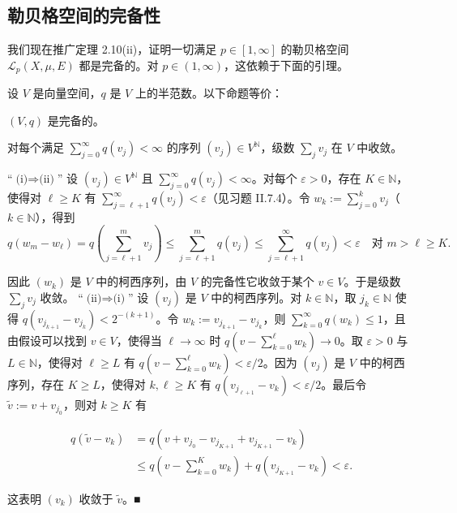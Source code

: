 \subsection*{勒贝格空间的完备性}

我们现在推广定理 2.10(ii)，证明一切满足 $ p \in [1,\infty] $ 的勒贝格空间 $ \mathcal{L}_p(X,\mu,E) $ 都是完备的。对 $ p \in (1,\infty) $，这依赖于下面的引理。

\begin{lemma}

设 $ V $ 是向量空间，$ q $ 是 $ V $ 上的半范数。以下命题等价：

\begin{subitems}
\item

$ (V,q) $ 是完备的。

\item

对每个满足 $ \sum_{j=0}^{\infty} q(v_j) < \infty $ 的序列 $ (v_j) \in V^{\mathbb{N}} $，级数 $ \sum_j v_j $ 在 $ V $ 中收敛。

\proofhead
“$ \text{(i)} \Rightarrow \text{(ii)} $” 设 $ (v_j) \in V^{\mathbb{N}} $ 且 $ \sum_{j=0}^{\infty} q(v_j) < \infty $。对每个 $ \varepsilon > 0 $，存在 $ K \in \mathbb{N} $，使得对 $ \ell \ge K $ 有 $ \sum_{j=\ell+1}^{\infty} q(v_j) < \varepsilon $（见习题 II.7.4）。令 $ w_k := \sum_{j=0}^{k} v_j $（$ k \in \mathbb{N} $），得到
\[
q(w_m - w_\ell) = q\left(\sum_{j=\ell+1}^{m} v_j\right) \le \sum_{j=\ell+1}^{m} q(v_j) \le \sum_{j=\ell+1}^{\infty} q(v_j) < \varepsilon \quad \text{对 } m > \ell \ge K .
\]

因此 $ (w_k) $ 是 $ V $ 中的柯西序列，由 $ V $ 的完备性它收敛于某个 $ v \in V $。于是级数 $ \sum_j v_j $ 收敛。
“$ \text{(ii)} \Rightarrow \text{(i)} $” 设 $ (v_j) $ 是 $ V $ 中的柯西序列。对 $ k \in \mathbb{N} $，取 $ j_k \in \mathbb{N} $ 使得 $ q(v_{j_{k+1}} - v_{j_k}) < 2^{-(k+1)} $。令 $ w_k := v_{j_{k+1}} - v_{j_k} $，则 $ \sum_{k=0}^{\infty} q(w_k) \le 1 $，且由假设可以找到 $ v \in V $，使得当 $ \ell \to \infty $ 时 $ q(v - \sum_{k=0}^{\ell} w_k) \to 0 $。取 $ \varepsilon > 0 $ 与 $ L \in \mathbb{N} $，使得对 $ \ell \ge L $ 有 $ q(v - \sum_{k=0}^{\ell} w_k) < \varepsilon/2 $。因为 $ (v_j) $ 是 $ V $ 中的柯西序列，存在 $ K \ge L $，使得对 $ k, \ell \ge K $ 有 $ q(v_{j_{\ell+1}} - v_k) < \varepsilon/2 $。最后令 $ \tilde{v} := v + v_{j_0} $，则对 $ k \ge K $ 有

\begin{equation*}
\begin{aligned}
q(\tilde{v} - v_k) &= q(v + v_{j_0} - v_{j_{K+1}} + v_{j_{K+1}} - v_k) \\ &\le q\left(v - \sum_{k=0}^{K} w_k\right) + q(v_{j_{K+1}} - v_k) < \varepsilon .
\end{aligned}
\end{equation*}

这表明 $ (v_k) $ 收敛于 $ \tilde{v} $。\nobreak\hspace{0.35em}■

\end{subitems}

\end{lemma}


